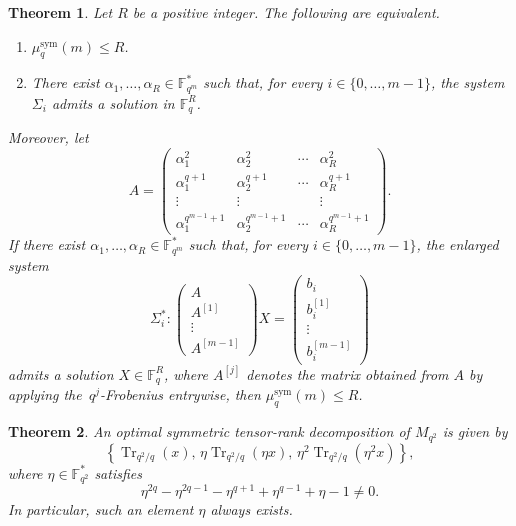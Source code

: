 \documentclass[10pt,a4paper]{amsart}
\newtheorem{theorem}{Theorem}
\begin{document}
\begin{theorem}\label{thm:charactfinal}
Let \(R\) be a positive integer. The following are equivalent.
\begin{enumerate}
    \item \(\mu_q^{\mathrm{sym}}(m)\leq R\).
    \item There exist \(\alpha_1,\ldots,\alpha_R\in\mathbb F_{q^m}^{*}\) such that,
    for every \(i\in\{0,\ldots,m-1\}\), the system \(\Sigma_i\) admits a solution
    in \(\mathbb F_q^R\).
\end{enumerate}

Moreover, let
\[
A=
\begin{pmatrix}
\alpha_1^2 & \alpha_2^2 & \cdots & \alpha_R^2\\
\alpha_1^{q+1} & \alpha_2^{q+1} & \cdots & \alpha_R^{q+1}\\
\vdots & \vdots & & \vdots\\
\alpha_1^{q^{m-1}+1} & \alpha_2^{q^{m-1}+1} & \cdots & \alpha_R^{q^{m-1}+1}
\end{pmatrix}.
\]
If there exist \(\alpha_1,\ldots,\alpha_R\in\mathbb F_{q^m}^{*}\) such that, for every
\(i\in\{0,\ldots,m-1\}\), the enlarged system
\[
\Sigma_i^{*}\colon
\begin{pmatrix}
A\\
A^{[1]}\\
\vdots\\
A^{[m-1]}
\end{pmatrix}
X
=
\begin{pmatrix}
b_i\\
b_i^{[1]}\\
\vdots\\
b_i^{[m-1]}
\end{pmatrix}
\]
admits a solution \(X\in\mathbb F_q^R\), where \(A^{[j]}\) denotes the matrix obtained
from \(A\) by applying the~\(q^j\)-Frobenius entrywise, then $\mu_q^{\mathrm{sym}}(m)\leq R$.
\end{theorem}

\begin{theorem}\label{thm:m=2}
An optimal symmetric tensor-rank decomposition of \(M_{q^2}\) is given by
\begin{equation}\label{eq:3traces1,eta,eta2}
\left\{
\operatorname{Tr}_{q^2/q}(x),\,
\eta\operatorname{Tr}_{q^2/q}(\eta x),\,
\eta^2\operatorname{Tr}_{q^2/q}(\eta^2x)
\right\},
\end{equation}
where \(\eta\in\mathbb F_{q^2}^{*}\) satisfies
\[
\eta^{2q}-\eta^{2q-1}-\eta^{q+1}+\eta^{q-1}+\eta-1\neq 0.
\]
In particular, such an element \(\eta\) always exists.
\end{theorem}
\end{document}
